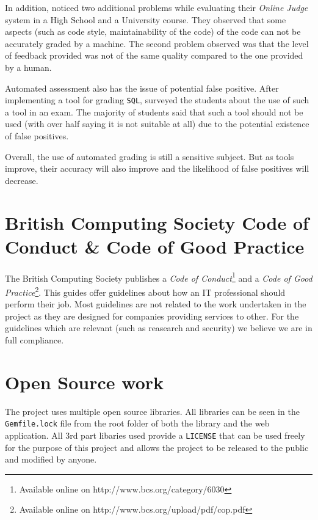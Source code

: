 In addition, \cite{literature:assesment:automated:brenda} noticed two additional problems while evaluating their \textit{Online Judge} system in a High School and a University course. They observed that some aspects (such as code style, maintainability of the code) of the code can not be accurately graded by a machine. The second problem observed was that the level of feedback provided was not of the same quality compared to the one provided by a human.

Automated assessment also has the issue of potential false positive. After implementing a tool for grading \texttt{SQL}, \cite{literature:asqlg} surveyed the students about the use of such a tool in an exam. The majority of students said that such a tool should not be used (with over half saying it is not suitable at all) due to the potential existence of false positives.

Overall, the use of automated grading is still a sensitive subject. But as tools improve, their accuracy will also improve and the likelihood of false positives will decrease.

\section{British Computing Society Code of Conduct \& Code of Good Practice}

The British Computing Society publishes a \textit{Code of Conduct}\footnote{Available online on http://www.bcs.org/category/6030 } and a \textit{Code of Good Practice}\footnote{Available online on http://www.bcs.org/upload/pdf/cop.pdf}. This guides offer guidelines about how an IT professional should perform their job. Most guidelines are not related to the work undertaken in the project as they are designed for companies providing services to other. For the guidelines which are relevant (such as reasearch and security) we believe we are in full compliance.

\section{Open Source work}
The project uses multiple open source libraries. All libraries can be seen in the \texttt{Gemfile.lock} file from the root folder of both the library and the web application. All 3rd part libaries used provide a \texttt{LICENSE} that can be used freely for the purpose of this project and allows the project to be released to the public and modified by anyone.
